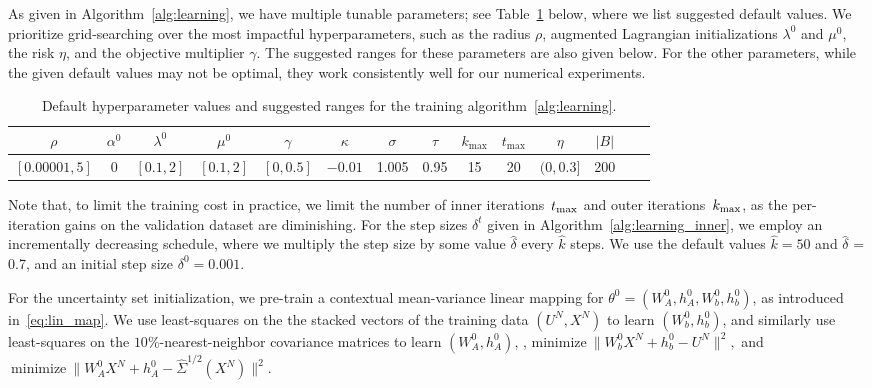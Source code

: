 As given in Algorithm~\ref{alg:learning}, we have multiple tunable parameters; see Table~\ref{tab:default} below, where we list suggested default values.
We prioritize grid-searching over the most impactful hyperparameters, such as the radius $\rho$, augmented Lagrangian initializations $\lambda^0$ and $\mu^0$, the risk $\eta$, and the objective multiplier $\gamma$. The suggested ranges for these parameters are also given below. For the other parameters, while the given default values may not be optimal, they work consistently well for our numerical experiments.
\begin{table}[ht]
	\footnotesize
  \centering
	\begin{tabular}{cccccccccccccc}\toprule
	$\rho$& $\alpha^0$ & $\lambda^0$ & $\mu^0 $ & $\gamma$ &$\kappa$ & $\sigma$ & $\tau$ & $k_{\text{max}}$ & $t_{\text{max}}$ & $\eta$ & $|B|$\\
		\midrule
   $[0.00001,5]$ &0  & $[0.1,2]$ & $[0.1,2]$  & $[0,0.5]$ & $-0.01 $& 1.005 & 0.95 & 15 & 20 & $(0,0.3]$& 200\\
	\bottomrule
		\end{tabular}
		\caption{Default hyperparameter values and suggested ranges for the training algorithm~\ref{alg:learning}.}
		\label{tab:default}
	\end{table}

Note that, to limit the training cost in practice, we limit the number of inner iterations~$t_{\rm max}$ and outer iterations~$k_{\rm max}$, as the per-iteration gains on the validation dataset are diminishing. 
For the step sizes $\delta^t$ given in Algorithm~\ref{alg:learning_inner}, we employ an incrementally decreasing schedule, where we multiply the step size by some value $\hat{\delta}$ every $\hat{k}$ steps. We use the default values $\hat{k} = 50$ and $\hat{\delta}$ = 0.7, and an initial step size $\delta^0 = 0.001$.

For the uncertainty set initialization, we pre-train a contextual mean-variance linear mapping for $\theta^0 = (W_A^0, h_A^0,W_b^0, h_b^0)$, as introduced in~\eqref{eq:lin_map}. We use least-squares on the the stacked vectors of the training data $(U^N,X^N)$ to learn $(W_b^0, h_b^0)$, and similarly use least-squares on the $10\%$-nearest-neighbor covariance matrices to learn $(W_A^0, h_A^0)$, \ie, 
$\text{minimize}~\|W_b^0X^N + h_b^0 - U^N\|^2,$ and$~\text{minimize}~\|W_A^0X^N + h_A^0 - \hat{\Sigma}^{1/2}(X^N)\|^2.$

